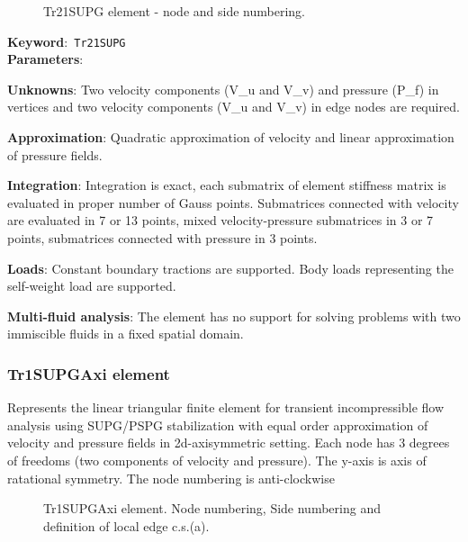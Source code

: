\documentclass[a4paper]{article}
\newcommand{\descitem}[1]{{\noindent \textbf{#1}}:}
\newcommand{\elemkeyword}[1]{\descitem{Keyword}~\param{#1}} %
\newcommand{\param}[1]{\texttt{#1}} %
\begin{document}
\begin{figure}[htb]
 \centering
 \begin{makeimage}
  
 \end{makeimage}
 \caption{Tr21SUPG element - node and side numbering.}
 \label{Tr21SUPGfig}
\end{figure}

\elemkeyword{Tr21SUPG}\\
\descitem{Parameters}

\descitem{Unknowns}
Two velocity components (V\_u and V\_v) and pressure (P\_f) in vertices and two velocity components (V\_u and V\_v) in edge nodes are required.

\descitem{Approximation} Quadratic approximation of velocity and linear approximation of pressure fields.

\descitem{Integration}
Integration is exact, each submatrix of element stiffness matrix is evaluated in proper number of
Gauss points. Submatrices connected with velocity are evaluated in 7 or 13 points, mixed velocity-pressure
submatrices in 3 or 7 points, submatrices connected with pressure in 3 points.

\descitem{Loads} Constant boundary tractions are supported. Body loads
representing the self-weight load are supported.

\descitem{Multi-fluid analysis} The element has no support for solving
problems with two immiscible fluids in a fixed spatial domain.

\subsubsection{Tr1SUPGAxi element}
\label{Tr1SUPGAxi}
Represents the linear triangular finite element for transient
incompressible flow analysis using SUPG/PSPG stabilization with equal order
approximation of velocity and pressure fields in 2d-axisymmetric setting. Each node has 3 degrees
of freedoms (two components of velocity and pressure). The y-axis is
axis of ratational symmetry. The node numbering is anti-clockwise

\begin{figure}[htb]
 \centering
 \begin{makeimage}
  
 \end{makeimage}
 \caption{Tr1SUPGAxi element. Node numbering, Side numbering and
 definition of local edge c.s.(a).}
 \label{Tr1SUPGAxifig}
\end{figure}
\end{document}
